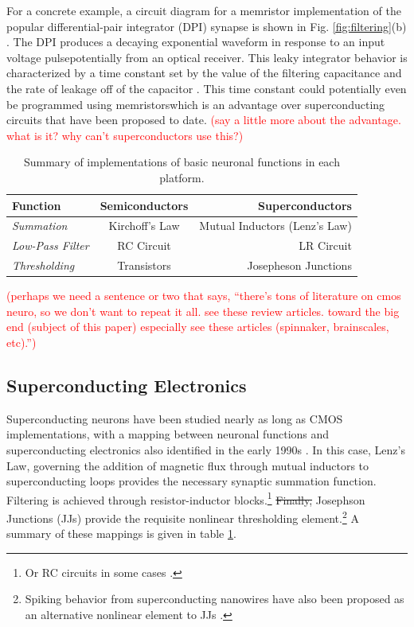 \documentclass[twocolumn]{article}
\begin{document}
For a concrete example, a circuit diagram for a memristor implementation of the popular differential-pair integrator (DPI) synapse is shown in Fig. \ref{fig:filtering}(b) \cite{dalgaty2019hybrid}. The DPI produces a decaying exponential waveform in response to an input voltage pulse\textemdash potentially from an optical receiver. This leaky integrator behavior is characterized by a time constant set by the value of the filtering capacitance and the rate of leakage off of the capacitor \cite{chicca2014neuromorphic}. This time constant could potentially even be programmed using memristors\textemdash which is an advantage over superconducting circuits that have been proposed to date. \textcolor{red}{(say a little more about the advantage. what is it? why can't superconductors use this?)}

\begin{table}[h]
  \begin{center}
    \label{tab:mathtable}
    \begin{tabular}{l|c|r} %
      \textbf{Function} & \textbf{Semiconductors} & \textbf{Superconductors}\\
      \hline
      \textit{Summation} & Kirchoff's Law & Mutual Inductors (Lenz's Law)\\
      \textit{Low-Pass Filter} & RC Circuit & LR Circuit\\
      \textit{Thresholding} & Transistors & Josepheson Junctions\\
    \end{tabular}
    \caption{Summary of implementations of basic neuronal functions in each platform.}
  \end{center}
\end{table}

\textcolor{red}{(perhaps we need a sentence or two that says, ``there's tons of literature on cmos neuro, so we don't want to repeat it all. see these review articles. toward the big end (subject of this paper) especially see these articles (spinnaker, brainscales, etc).'')}

\subsection{Superconducting Electronics}
Superconducting neurons have been studied nearly as long as CMOS implementations, with a mapping between neuronal functions and superconducting electronics also identified in the early 1990s \cite{hago1991, hiak1991}. In this case, Lenz's Law, governing the addition of magnetic flux through mutual inductors to superconducting loops provides the necessary synaptic summation function. Filtering is achieved through resistor-inductor blocks.\footnote{Or RC circuits in some cases \cite{crotty2010josephson}.} \sout{Finally,} Josephson Junctions (JJs) provide the requisite nonlinear thresholding element.\footnote{Spiking behavior from superconducting nanowires have also been proposed as an alternative nonlinear element to JJs \cite{toomey2019design}.} A summary of these mappings is given in table \ref{tab:mathtable}. 
\end{document}
